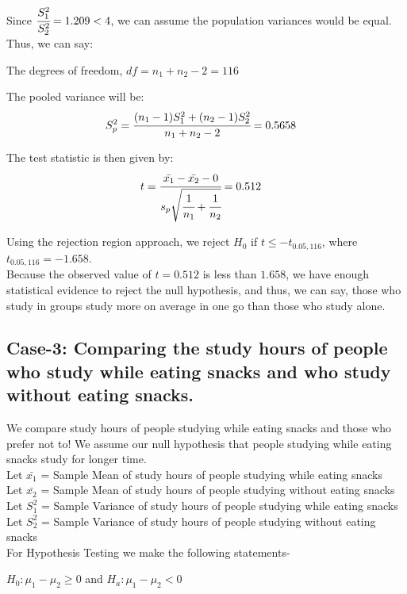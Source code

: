 \documentclass[12pt,onecolumn,letterpaper]{article}
\begin{document}
Since $\cfrac{S_1^2}{S_2^2} = 1.209 < 4$, we can assume the population variances would be equal. Thus, we can say: \par The degrees of freedom, $df = n_1 + n_2 -2 = 116$

 The pooled variance will be:
 \begin{align}
     S_p^2 &= \cfrac{(n_1-1)S_1^2 + (n_2-1)S_2^2}{n_1+n_2-2} = 0.5658
 \end{align}
      
     

The test statistic is then given by:
 \begin{align}
      t &= \cfrac{\bar{x_1} - \bar{x_2} - 0}{s_p\sqrt{\cfrac{1}{n_1} + \cfrac{1}{n_2}}} = 0.512
 \end{align}

 \par
 Using the rejection region approach, we reject $H_0$ if $t \leq -t_{0.05, 116}$, where $t_{0.05,116} = -1.658$.\\ 
 Because the observed value of $t=0.512$ is less than $1.658$, we have enough statistical evidence to reject the null hypothesis, and thus, we can say, those who study in groups study more on average in one go than those who study alone.
 
\subsection{Case-3: Comparing the study hours of people who study while eating snacks and who study without eating snacks.}
We compare study hours of people studying while eating snacks and those who prefer not to! We assume our null hypothesis that people studying while eating snacks study for longer time.\\

Let $\bar{x_1}$ = Sample Mean of study hours of people studying while eating snacks \\
Let $\bar{x_2}$ = Sample Mean of study hours of people studying without eating snacks \\
Let $S_1^2$ = Sample Variance of study hours of people studying while eating snacks \\
Let $S_2^2$ = Sample Variance of study hours of people studying without eating snacks \\ 



For Hypothesis Testing we make the following statements-
\begin{center}
    $ H_0 : \mu_1 - \mu_2 \geq 0$ and $H_a : \mu_1 - \mu_2 < 0$  \\
\end{center}
\end{document}

